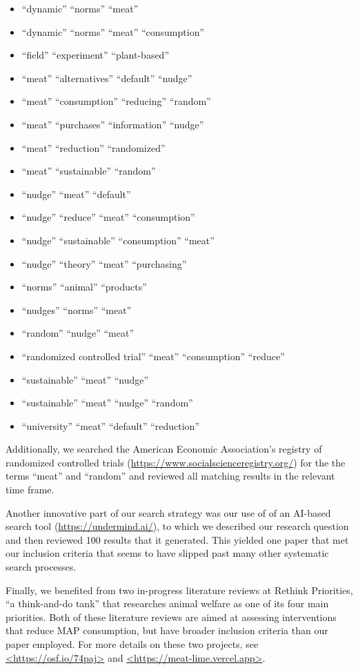 \documentclass[sn-nature,referee,lineno,pdflatex]{sn-jnl}
\providecommand{\tightlist}{%
  \setlength{\itemsep}{0pt}\setlength{\parskip}{0pt}}
\begin{document}
\begin{itemize}
\tightlist
\item
  ``dynamic'' ``norms'' ``meat''
\item
  ``dynamic'' ``norms'' ``meat'' ``consumption''
\item
  ``field'' ``experiment'' ``plant-based''
\item
  ``meat'' ``alternatives'' ``default'' ``nudge''
\item
  ``meat'' ``consumption'' ``reducing'' ``random''
\item
  ``meat'' ``purchases'' ``information'' ``nudge''
\item
  ``meat'' ``reduction'' ``randomized''
\item
  ``meat'' ``sustainable'' ``random''
\item
  ``nudge'' ``meat'' ``default''
\item
  ``nudge'' ``reduce'' ``meat'' ``consumption''
\item
  ``nudge'' ``sustainable'' ``consumption'' ``meat''
\item
  ``nudge'' ``theory'' ``meat'' ``purchasing''
\item
  ``norms'' ``animal'' ``products''
\item
  ``nudges'' ``norms'' ``meat''
\item
  ``random'' ``nudge'' ``meat''
\item
  ``randomized controlled trial'' ``meat'' ``consumption'' ``reduce''
\item
  ``sustainable'' ``meat'' ``nudge''
\item
  ``sustainable'' ``meat'' ``nudge'' ``random''
\item
  ``university'' ``meat'' ``default'' ``reduction''
\end{itemize}

Additionally, we searched the American Economic Association's registry
of randomized controlled trials
(\url{https://www.socialscienceregistry.org/}) for the the terms
``meat'' and ``random'' and reviewed all matching results in the
relevant time frame.

Another innovative part of our search strategy was our use of of an
AI-based search tool (\url{https://undermind.ai/}), to which we
described our research question and then reviewed 100 results that it
generated. This yielded one paper that met our inclusion criteria
\citep{mattson2020} that seems to have slipped past many other
systematic search processes.

Finally, we benefited from two in-progress literature reviews at Rethink
Priorities, ``a think-and-do tank'' that researches animal welfare as
one of its four main priorities. Both of these literature reviews are
aimed at assessing interventions that reduce MAP consumption, but have
broader inclusion criteria than our paper employed. For more details on
these two projects, see \url{<https://osf.io/74paj>} and
\url{<https://meat-lime.vercel.app>}.
\end{document}
